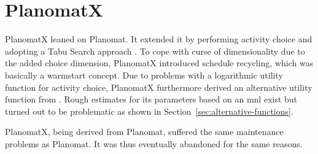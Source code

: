 
\section{PlanomatX}
\label{sec:planomatX}
PlanomatX leaned on Planomat. It extended it by performing activity choice and adopting a Tabu Search approach \citep[][]{Feil_PhDThesis_2010}. To cope with curse of dimensionality due to the added choice dimension, PlanomatX introduced schedule recycling, which was basically a warmstart concept. Due to problems with a logarithmic utility function for activity choice, PlanomatX furthermore derived an alternative utility function from \citet[][]{Joh_PhDThesis_2004}. Rough estimates for its parameters based on an \gls{mnl} exist but turned out to be problematic as shown in Section~\ref{sec:alternative-functions}.

PlanomatX, being derived from Planomat, suffered the same maintenance problems as Planomat. It was thus eventually abandoned for the same reasons.





